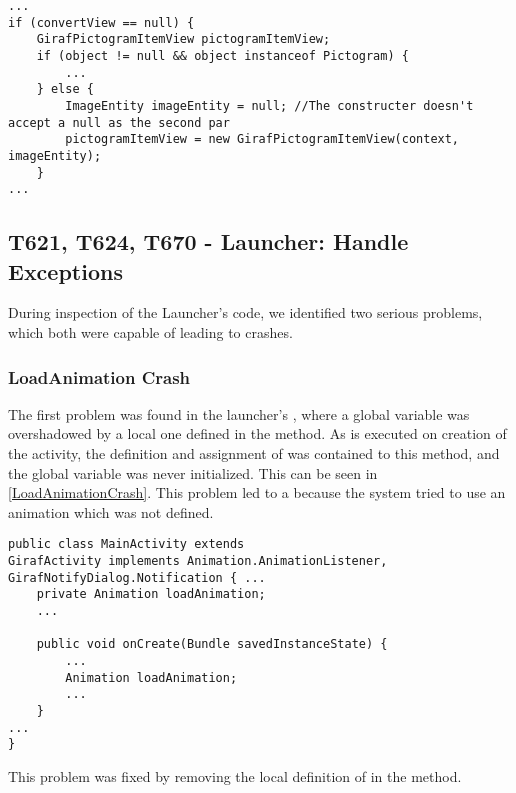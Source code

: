 \begin{minipage}[H]{\linewidth}
\begin{lstlisting}[caption = Return dummy object in case of null-valued object., label = UnitImageEntity] 
...
if (convertView == null) {
	GirafPictogramItemView pictogramItemView;
    if (object != null && object instanceof Pictogram) {
    	...
    } else {
    	ImageEntity imageEntity = null; //The constructer doesn't accept a null as the second par 
    	pictogramItemView = new GirafPictogramItemView(context, imageEntity); 
  	}
...
\end{lstlisting}
\end{minipage}

\subsection{T621, T624, T670 - Launcher: Handle Exceptions}
During inspection of the Launcher's code, we identified two serious problems,
which both were capable of leading to crashes.

\subsubsection{LoadAnimation Crash}
The first problem was found in the launcher's , where a
global variable  was overshadowed by a local one defined in
the  method. As  is executed on creation of the
activity, the definition and assignment of  was contained
to this method, and the global variable was never initialized. This can be seen
in \autoref{LoadAnimationCrash}. This problem led to a
 because the system tried to use an animation which
was not defined.\nl

\begin{minipage}[H]{\linewidth}
\begin{lstlisting}[caption = The variable \textc{loadAnimation} is overshadowed locally., label = LoadAnimationCrash] 
public class MainActivity extends
GirafActivity implements Animation.AnimationListener, GirafNotifyDialog.Notification { ...
    private Animation loadAnimation;
    ...
    
	public void onCreate(Bundle savedInstanceState) {
		...	
    	Animation loadAnimation;
		...
	}
...
}    
\end{lstlisting}
\end{minipage}

This problem was fixed by removing the local definition of 
in the  method.

